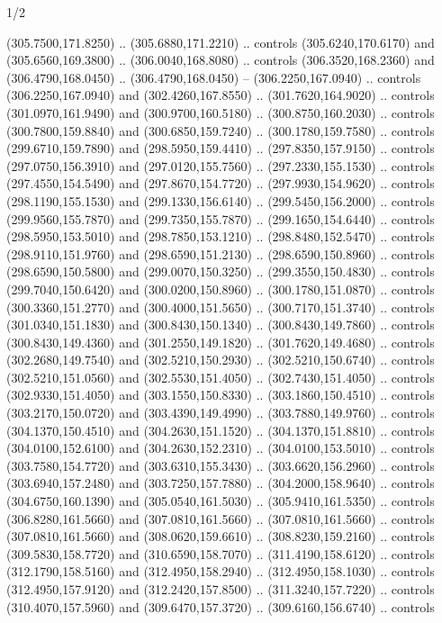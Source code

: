 \begin{flagdescription}{1/2}
\begin{scope}[xshift=0.5\flaglength]
\begin{scope}[scale=0.004\flagwidth,xshift=-90mm,yshift=89mm]
\begin{scope}[y=0.80pt, x=0.80pt, yscale=-1, xscale=1, inner sep=0pt, outer sep=0pt]
  (305.7500,171.8250) .. (305.6880,171.2210) .. controls (305.6240,170.6170) and
  (305.6560,169.3800) .. (306.0040,168.8080) .. controls (306.3520,168.2360) and
  (306.4790,168.0450) .. (306.4790,168.0450) -- (306.2250,167.0940) .. controls
  (306.2250,167.0940) and (302.4260,167.8550) .. (301.7620,164.9020) .. controls
  (301.0970,161.9490) and (300.9700,160.5180) .. (300.8750,160.2030) .. controls
  (300.7800,159.8840) and (300.6850,159.7240) .. (300.1780,159.7580) .. controls
  (299.6710,159.7890) and (298.5950,159.4410) .. (297.8350,157.9150) .. controls
  (297.0750,156.3910) and (297.0120,155.7560) .. (297.2330,155.1530) .. controls
  (297.4550,154.5490) and (297.8670,154.7720) .. (297.9930,154.9620) .. controls
  (298.1190,155.1530) and (299.1330,156.6140) .. (299.5450,156.2000) .. controls
  (299.9560,155.7870) and (299.7350,155.7870) .. (299.1650,154.6440) .. controls
  (298.5950,153.5010) and (298.7850,153.1210) .. (298.8480,152.5470) .. controls
  (298.9110,151.9760) and (298.6590,151.2130) .. (298.6590,150.8960) .. controls
  (298.6590,150.5800) and (299.0070,150.3250) .. (299.3550,150.4830) .. controls
  (299.7040,150.6420) and (300.0200,150.8960) .. (300.1780,151.0870) .. controls
  (300.3360,151.2770) and (300.4000,151.5650) .. (300.7170,151.3740) .. controls
  (301.0340,151.1830) and (300.8430,150.1340) .. (300.8430,149.7860) .. controls
  (300.8430,149.4360) and (301.2550,149.1820) .. (301.7620,149.4680) .. controls
  (302.2680,149.7540) and (302.5210,150.2930) .. (302.5210,150.6740) .. controls
  (302.5210,151.0560) and (302.5530,151.4050) .. (302.7430,151.4050) .. controls
  (302.9330,151.4050) and (303.1550,150.8330) .. (303.1860,150.4510) .. controls
  (303.2170,150.0720) and (303.4390,149.4990) .. (303.7880,149.9760) .. controls
  (304.1370,150.4510) and (304.2630,151.1520) .. (304.1370,151.8810) .. controls
  (304.0100,152.6100) and (304.2630,152.2310) .. (304.0100,153.5010) .. controls
  (303.7580,154.7720) and (303.6310,155.3430) .. (303.6620,156.2960) .. controls
  (303.6940,157.2480) and (303.7250,157.7880) .. (304.2000,158.9640) .. controls
  (304.6750,160.1390) and (305.0540,161.5030) .. (305.9410,161.5350) .. controls
  (306.8280,161.5660) and (307.0810,161.5660) .. (307.0810,161.5660) .. controls
  (307.0810,161.5660) and (308.0620,159.6610) .. (308.8230,159.2160) .. controls
  (309.5830,158.7720) and (310.6590,158.7070) .. (311.4190,158.6120) .. controls
  (312.1790,158.5160) and (312.4950,158.2940) .. (312.4950,158.1030) .. controls
  (312.4950,157.9120) and (312.2420,157.8500) .. (311.3240,157.7220) .. controls
  (310.4070,157.5960) and (309.6470,157.3720) .. (309.6160,156.6740) .. controls

\end{scope}
\end{scope}
\end{scope}
\end{flagdescription}
